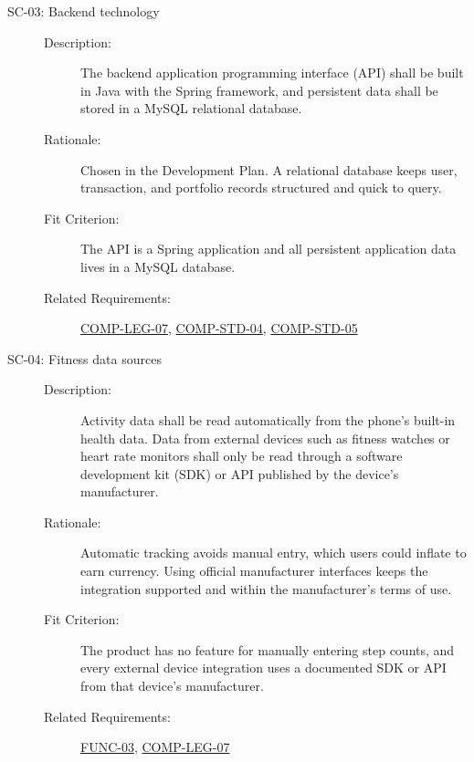 \documentclass[12pt]{article}
\newcommand{\acr}[3]{\phantomsection\label{acr:#1}#2 (#3)}
\begin{document}
\begin{description}
  \item[{SC-03\hypertarget{req:SC-03}{}}: Backend technology]\leavevmode
  \begin{description}
    \item[Description:] The backend \acr{API}{application programming interface}{API} shall be built in Java with the Spring
    framework, and persistent data shall be stored in a MySQL relational
    database.
    \item[Rationale:] Chosen in the Development Plan. A relational database
    keeps user, transaction, and portfolio records structured and quick to
    query.
    \item[Fit Criterion:] The API is a Spring application and all persistent
    application data lives in a MySQL database.
    \item[Related Requirements:] \hyperlink{req:COMP-LEG-07}{COMP-LEG-07}, \hyperlink{req:COMP-STD-04}{COMP-STD-04}, \hyperlink{req:COMP-STD-05}{COMP-STD-05}
  \end{description}

  \item[{SC-04\hypertarget{req:SC-04}{}}: Fitness data sources]\leavevmode
  \begin{description}
    \item[Description:] Activity data shall be read automatically from the
    phone's built-in health data. Data from external devices such as fitness
    watches or heart rate monitors shall only be read through a \acr{SDK}{software development kit}{SDK} or API
    published by the device's manufacturer.
    \item[Rationale:] Automatic tracking avoids manual entry, which users could
    inflate to earn currency. Using official manufacturer interfaces keeps the
    integration supported and within the manufacturer's terms of use.
    \item[Fit Criterion:] The product has no feature for manually entering step
    counts, and every external device integration uses a documented SDK or API
    from that device's manufacturer.
    \item[Related Requirements:] \hyperlink{req:FUNC-03}{FUNC-03}, \hyperlink{req:COMP-LEG-07}{COMP-LEG-07}
  \end{description}


\end{description}
\end{document}
